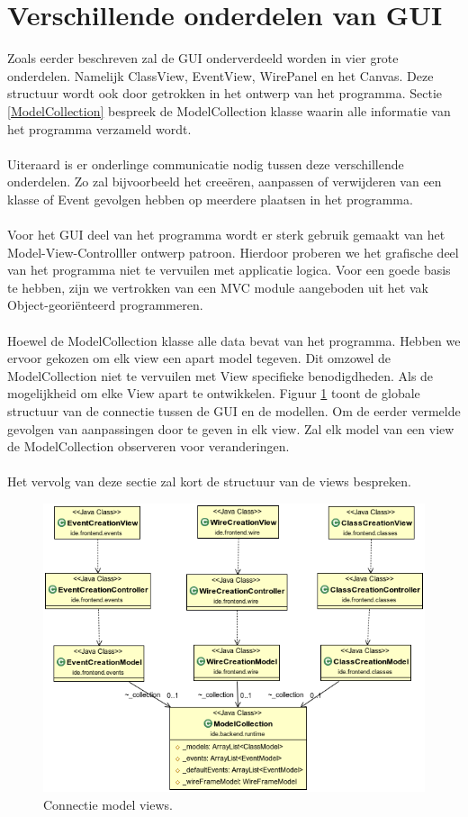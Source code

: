 \documentclass[]{article}
\begin{document}
\section{Verschillende onderdelen van GUI}
Zoals eerder beschreven zal de GUI onderverdeeld worden in vier grote onderdelen. Namelijk ClassView, EventView, WirePanel en het Canvas. Deze structuur wordt ook door getrokken in het ontwerp van het programma. Sectie \ref{ModelCollection} bespreek de ModelCollection klasse waarin alle informatie van het programma verzameld wordt.\\\\
Uiteraard is er onderlinge communicatie nodig tussen deze verschillende onderdelen. Zo zal bijvoorbeeld het cree\"{e}ren, aanpassen of verwijderen van een klasse of Event gevolgen hebben op meerdere plaatsen in het programma.\\\\
Voor het GUI deel van het programma wordt er sterk gebruik gemaakt van het Model-View-Controlller ontwerp patroon. Hierdoor proberen we het grafische deel van het programma niet te vervuilen met applicatie logica. Voor een goede basis te hebben, zijn we vertrokken van een MVC module aangeboden uit het vak Object-geori\"{e}nteerd programmeren.\\\\
Hoewel de ModelCollection klasse alle data bevat van het programma. Hebben we ervoor gekozen om elk view een apart model tegeven. Dit omzowel de ModelCollection niet te vervuilen met View specifieke benodigdheden. Als de mogelijkheid om elke View apart te ontwikkelen. Figuur \ref{highlevelViews} toont de globale structuur van de connectie tussen de GUI en de modellen. Om de eerder vermelde gevolgen van aanpassingen door te geven in elk view. Zal elk model van een view de ModelCollection observeren voor veranderingen.\\\\
Het vervolg van deze sectie zal kort de structuur van de views bespreken. 
\begin{figure}[H]
  \centering
\includegraphics[scale=0.4]{AnalyseADTAlgorithm/viewsmvc/highlevel}
  \caption{Connectie model views.} \label{highlevelViews}
\end{figure}
\end{document}
